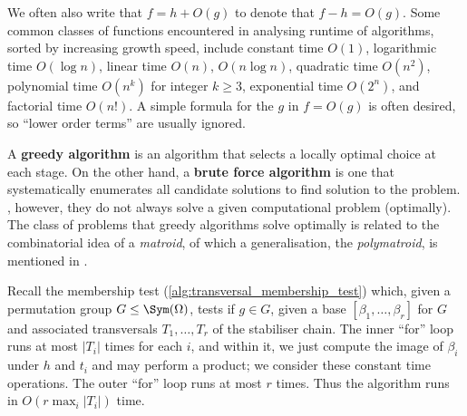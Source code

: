 We often also write that $f = h + O(g)$ to denote that $f - h = O(g)$. Some common classes of functions encountered in analysing runtime of algorithms, sorted by increasing growth speed, include constant time $O(1)$, logarithmic time $O(\log n)$, linear time $O(n)$, $O(n\log n)$, quadratic time $O(n^2)$, polynomial time $O(n^k)$ for integer $k \geq 3$, exponential time $O(2^n)$, and factorial time $O(n!)$. A simple formula for the $g$ in $f = O(g)$ is often desired, so ``lower order terms'' are usually ignored. 


A \textbf{greedy algorithm} is an algorithm that selects a locally optimal choice at each stage. On the other hand, a \textbf{brute force algorithm} is one that systematically enumerates all candidate solutions to find  solution to the problem. , however, they do not always solve a given computational problem (optimally). The class of problems that greedy algorithms solve optimally is related to the combinatorial idea of a \textit{matroid}, of which a generalisation, the \textit{polymatroid}, is mentioned in \cite{blaha1992}.

\begin{example}\label{eg:alg:transversal_membership_test:complexity}
  Recall the membership test (\autoref{alg:transversal_membership_test}) which, given a permutation group $G \leq \Sym(\Omega)$, tests if $g \in G$, given a base $[\beta_1,\dotsc,\beta_r]$ for $G$ and associated transversals $T_1,\dotsc,T_r$ of the stabiliser chain. The inner ``for'' loop runs at most $|T_i|$ times for each $i$, and within it, we just compute the image of $\beta_i$ under $h$ and $t_i$ and may perform a product; we consider these constant time operations. The outer ``for'' loop runs at most $r$ times. Thus the algorithm runs in $O(r\max_i |T_i|)$ time.
\end{example}

